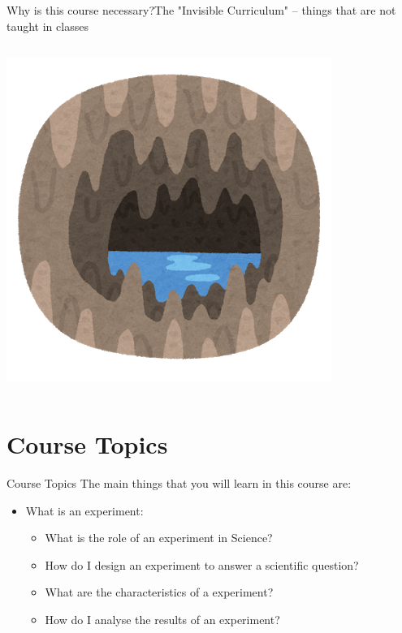 \documentclass[aspectratio=169]{beamer}
\begin{document}
\begin{CJK}{UTF8}{ipxm}
\begin{frame}{Why is this course necessary?}{The "Invisible
    Curriculum" -- things that are not taught in classes}
\begin{columns}
    \includegraphics[width=1\textwidth]{../img/irasutoya_cave}
  \end{columns}
  \bigskip

\end{frame}

\section{Course Topics}
\begin{frame}{Course Topics}
  The main things that you will learn in this course are:\bigskip

  \begin{itemize}
    \item What is an experiment:
    \begin{itemize}
      \item What is the role of an experiment in Science?
      \item How do I design an experiment to answer a scientific question?
      \item What are the characteristics of a  experiment?
      \item How do I analyse the results of an experiment?
    \end{itemize}\bigskip


\end{itemize}
\end{frame}
\end{CJK}
\end{document}
